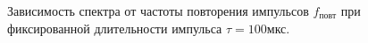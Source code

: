 \documentclass[a4paper, 12pt,twoside]{article}
\begin{document}
\begin{figure}[H]
	\centering
	
	\begin{minipage}[h]{0.49\linewidth}
	\end{minipage}
	\begin{minipage}[h]{0.49\linewidth}
	\end{minipage}
	
	\caption{Зависимость спектра от частоты повторения импульсов $f_{повт}$ при фиксированной длительности импульса  $\tau = 100\text{мкс}$.}
	\label{ris:image2}
\end{figure}
\end{document}
